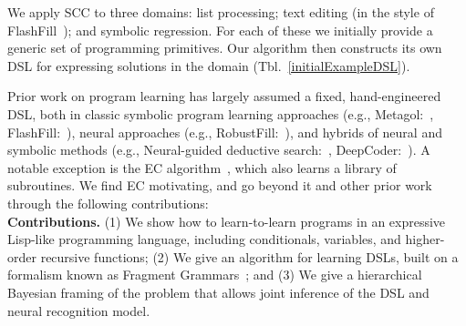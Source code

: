 \documentclass{article}
\newcommand{\system}{\textsc{SCC} }
\begin{document}
We apply \system to three domains:
list processing; text editing (in the style of FlashFill~\cite{gulwani2011automating}); and symbolic regression.
 For each of these we initially provide a generic
 set of programming primitives.
Our algorithm then constructs
its own DSL for expressing solutions in the domain (Tbl.~\ref{initialExampleDSL}).


Prior work on program learning has largely assumed a fixed, hand-engineered DSL,
both in classic symbolic program learning approaches (e.g., Metagol:~\cite{muggleton2015meta},
FlashFill:~\cite{gulwani2011automating}),
neural approaches  (e.g., RobustFill:~\cite{devlin2017robustfill}), and hybrids of neural and
symbolic methods (e.g., Neural-guided deductive search:~\cite{ngds}, DeepCoder:~\cite{balog2016deepcoder}).
A notable exception is the EC algorithm~\cite{Dechter:2013:BLV:2540128.2540316},
which also learns a library of subroutines.
We find EC motivating, and go beyond it and other prior work through the following contributions:%
\noindent\\\textbf{Contributions.} (1) We show how to learn-to-learn programs in an expressive Lisp-like programming language, including conditionals, variables, and higher-order recursive functions;
(2) We give an algorithm for learning DSLs,
built on a formalism known as Fragment Grammars~\cite{tim};
and (3) We give a hierarchical Bayesian framing of
the problem that
allows joint inference of the DSL and neural recognition model.



 


\end{document}
